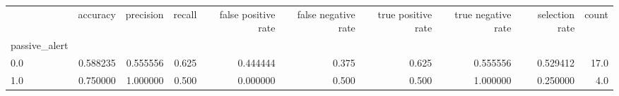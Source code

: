 \begin{tabular}{lrrrrrrrrr}
\toprule
{} &  accuracy &  precision &  recall &  false positive rate &  false negative rate &  true positive rate &  true negative rate &  selection rate &  count \\
passive\_alert &           &            &         &                      &                      &                     &                     &                 &        \\
\midrule
0.0           &  0.588235 &   0.555556 &   0.625 &             0.444444 &                0.375 &               0.625 &            0.555556 &        0.529412 &   17.0 \\
1.0           &  0.750000 &   1.000000 &   0.500 &             0.000000 &                0.500 &               0.500 &            1.000000 &        0.250000 &    4.0 \\
\bottomrule
\end{tabular}
